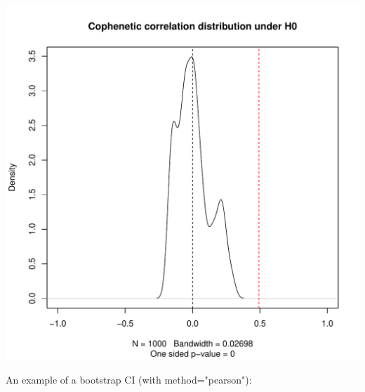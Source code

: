\documentclass[shortnames,nojss,article]{jss}\usepackage[]{graphicx}\usepackage[]{color}
\makeatletter
\def\maxwidth{ %
  \ifdim\Gin@nat@width>\linewidth
    \linewidth
  \else
    \Gin@nat@width
  \fi
}
\newenvironment{knitrout}{}{} %
\makeatother
\begin{document}
\begin{knitrout}
{\centering \includegraphics[width=\maxwidth]{figure/cor_cophenetic_simulation_2} 

}



\end{knitrout}




An example of a bootstrap CI (with method="pearson"):
\end{document}
